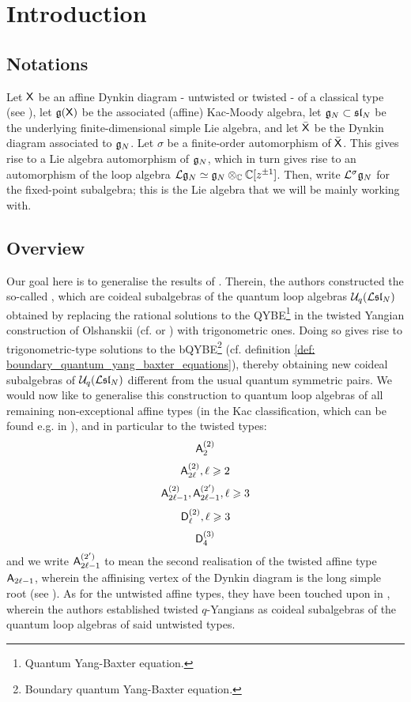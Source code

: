 \section{Introduction}
    \subsection{Notations}
        Let $\mathsf{X}$ be an affine Dynkin diagram - untwisted or twisted - of a classical type (see \cite[Chapter 4, Tables Aff 2 and 3, p. 55]{kac_infinite_dimensional_lie_algebras}), let $\mathfrak{g}(\mathsf{X})$ be the associated (affine) Kac-Moody algebra, let $\mathfrak{g}_N \subset \mathfrak{sl}_N$ be the underlying finite-dimensional simple Lie algebra, and let $\bar{\mathsf{X}}$ be the Dynkin diagram associated to $\mathfrak{g}_N$. Let $\sigma$ be a finite-order automorphism of $\bar{\mathsf{X}}$. This gives rise to a Lie algebra automorphism of $\mathfrak{g}_N$, which in turn gives rise to an automorphism of the loop algebra $\Loop\g_N \cong \g_N \tensor_{\bbC} \bbC[z^{\pm 1}]$. Then, write $\mathcal{L}^{\sigma}\mathfrak{g}_N$ for the fixed-point subalgebra; this is the Lie algebra that we will be mainly working with. 

    \subsection{Overview}
        Our goal here is to generalise the results of \cite{molev_ragoucy_sorba_twisted_q_yangians_type_A}. Therein, the authors constructed the so-called , which are coideal subalgebras of the quantum loop algebras $\mathcal{U}_q(\mathcal{L}\mathfrak{sl}_N)$ obtained by replacing the rational solutions to the QYBE\footnote{Quantum Yang-Baxter equation.} in the twisted Yangian construction of Olshanskii (cf. \cite{olshanski_twisted_yangians_and_infinite_dimensional_classical_lie_algebras} or \cite[Chapter 2]{molev_yangians_and_classical_lie_algebras}) with trigonometric ones. Doing so gives rise to trigonometric-type solutions to the bQYBE\footnote{Boundary quantum Yang-Baxter equation.} (cf. definition \ref{def: boundary_quantum_yang_baxter_equations}), thereby obtaining new coideal subalgebras of $\mathcal{U}_q(\mathcal{L}\mathfrak{sl}_N)$ different from the usual quantum symmetric pairs. We would now like to generalise this construction to quantum loop algebras of all remaining non-exceptional affine types (in the Kac classification, which can be found e.g. in \cite[Chapter 4]{kac_infinite_dimensional_lie_algebras}), and in particular to the twisted types:
            $$\mathsf{A}_2^{(2)}$$
            $$\mathsf{A}_{2\ell}^{(2)}, \ell \geqslant 2$$
            $$\mathsf{A}_{2\ell - 1}^{(2)}, \mathsf{A}_{2\ell - 1}^{(2')}, \ell \geqslant 3$$
            $$\mathsf{D}_{\ell}^{(2)}, \ell \geqslant 3$$
            $$\mathsf{D}_4^{(3)}$$
        and we write $\mathsf{A}_{2\ell - 1}^{(2')}$ to mean the second realisation of the twisted affine type $\mathsf{A}_{2\ell - 1}$, wherein the affinising vertex of the Dynkin diagram is the long simple root (see \cite[Chapter 4, Tables Aff 2 and 3, p. 55]{kac_infinite_dimensional_lie_algebras}). As for the untwisted affine types, they have been touched upon in \cite{regelskis_vlaar_reflection_matrices_coideal_subalgebras}, wherein the authors established twisted $q$-Yangians as coideal subalgebras of the quantum loop algebras of said untwisted types.  
        
